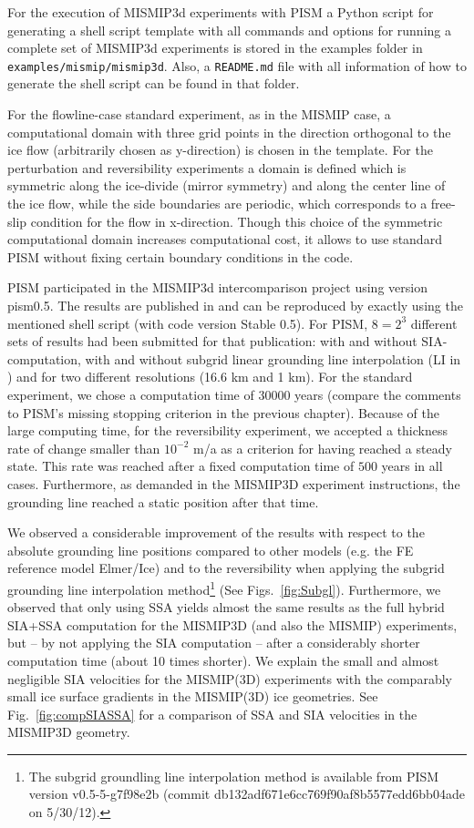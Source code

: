 For the execution of MISMIP3d experiments with PISM a Python script for generating a shell script template with all commands and options for running a complete set of MISMIP3d experiments is stored in the examples folder in \texttt{examples/mismip/mismip3d}. Also, a \texttt{README.md} file with all information of how to generate the shell script can be found in that folder.

For the flowline-case standard experiment, as in the MISMIP case, a computational domain with three grid points in the direction orthogonal to the ice flow (arbitrarily chosen as y-direction) is chosen in the template. For the perturbation and reversibility experiments a domain is defined which is symmetric along the ice-divide (mirror symmetry) and along the center line of the ice flow, while the side boundaries are periodic, which corresponds to a free-slip condition for the flow in x-direction. Though this choice of the symmetric computational domain increases computational cost, it allows to use standard PISM without fixing certain boundary conditions in the code.

PISM participated in the MISMIP3d intercomparison project using version pism0.5. The results are published in \cite{MISMIP3d2013} and can be reproduced by exactly using the mentioned shell script (with code version Stable 0.5). For PISM, $8=2^3$ different sets of results had been submitted for that publication: with and without SIA-computation, with and without subgrid linear grounding line interpolation (LI in \cite{Gladstoneetal2012}) and for two different resolutions (16.6 km and 1 km). For the standard experiment, we chose a computation time of $30000$ years (compare the comments to PISM's missing stopping criterion in the previous chapter). Because of the large computing time, for the reversibility experiment, we accepted a thickness rate of change smaller than $10^{−2}$ m/a as a criterion for having reached a steady state. This rate was reached after a fixed computation time of $500$ years in all cases. Furthermore, as demanded in the MISMIP3D experiment instructions, the grounding line reached a static position after that time.

We observed a considerable improvement of the results with respect to the absolute grounding line positions compared to other models (e.g. the FE reference model Elmer/Ice) and to the reversibility when applying the subgrid grounding line interpolation method\footnote{The subgrid groundling line interpolation method is available from PISM version v0.5-5-g7f98e2b (commit db132adf671e6cc769f90af8b5577edd6bb04ade on 5/30/12).} (See Figs.~\ref{fig:Subgl}). Furthermore, we observed that only using SSA yields almost the same results as the full hybrid SIA+SSA computation for the MISMIP3D (and also the MISMIP) experiments, but -- by not applying the SIA computation -- after a considerably shorter computation time (about 10 times shorter). We explain the small and almost negligible SIA velocities for the MISMIP(3D) experiments with the comparably small ice surface gradients in the MISMIP(3D) ice geometries. See Fig.~\ref{fig:compSIASSA} for a comparison of SSA and SIA velocities in the MISMIP3D geometry.


